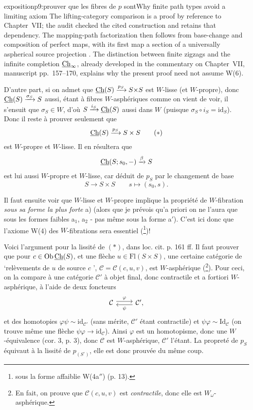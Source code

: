 \begin{dcomment}{exposition}{p9:prouver que les fibres de $p$ sont}{Why finite path types avoid a limiting axiom}
The lifting-category comparison is a proof by reference to Chapter~VII; the audit checked the cited construction and retains that dependency. The mapping-path factorization then follows from base-change and composition of perfect maps, with its first map a section of a universally aspherical source projection \citep[manuscript pp.~170--171]{GrothendieckDerivateursVII}. The distinction between finite zigzags and the infinite completion \(\underline{\mathrm{Ch}}_\infty\), already developed in the commentary on Chapter~VII, manuscript pp.~157--170, explains why the present proof need not assume W(6).
\end{dcomment}


D'autre part, si on admet que $\underline{\mathrm{Ch}}(S) \xrightarrow{p_S} S{\times}S$ est $W$-lisse (et $W$-propre), donc $\underline{\mathrm{Ch}}(S) \xrightarrow{\sigma_S} S$ aussi, étant à fibres $W$-asphériques comme on vient de voir, il s'ensuit que $\sigma_S \in W$, d'où $S \xrightarrow{i_S} \underline{\mathrm{Ch}}(S)$ aussi dans $W$ (puisque $\sigma_S \circ i_S = \mathrm{id}_S$). Donc il reste à prouver seulement que
\[ \underline{\mathrm{Ch}}(S) \xrightarrow{p_S} S \times S \tag*{$(*)$} \]
est $W$-propre et $W$-lisse. Il en résultera que
\[ \underline{\mathrm{Ch}}(S; s_0, -) \xrightarrow{\beta} S \]
est lui aussi $W$-propre et $W$-lisse, car déduit de $p_S$ par le changement de base
\[ S \longrightarrow S \times S \qquad s \longmapsto (s_0, s). \]

Il faut ensuite voir que $W$-lisse et $W$-propre implique la propriété de $W$-fibration \textit{sous sa forme la plus forte} a) (alors que je prévois qu'a priori on ne l'aura que sous les formes faibles a$_1$, a$_2$ - pas même sous la forme a$'$). C'est ici donc que l'axiome W(4) des $W$-fibrations sera essentiel (\footnote[15]{sous la forme affaiblie W(4a$''$) (p. 13).})!

Voici l'argument pour la lissité de $(*)$, dans loc. cit. p. 161 ff. Il faut prouver que pour $c \in \mathrm{Ob}\,\underline{\mathrm{Ch}}(S)$, et une flèche $u \in \mathrm{Fl}(S \times S)$, une certaine catégorie de ‘relèvements de $u$ de source $c$ ’, $\mathcal{C} = \mathcal{C}(c,u,v)$, est $W$-asphérique (\footnote[16]{En fait, on prouve que $\mathcal{C}(c,u,v)$ est \textit{contractile}, donc elle est $W_\omega$-asphérique.}). Pour ceci, on la compare à une catégorie $\mathcal{C}'$ à objet final, donc contractile et a fortiori $W$-asphérique, à l'aide de deux foncteurs
\[ \begin{tikzcd} \mathcal{C} \arrow[r, shift left, "\varphi"] & \mathcal{C}', \arrow[l, shift left, "\psi"] \end{tikzcd} \]
et des homotopies $\varphi\psi \sim \mathrm{id}_{\mathcal{C}'}$ (sans mérite, $\mathcal{C}'$ étant contractile)
et $\psi\varphi \sim \mathrm{Id}_{\mathcal{C}}$ (on trouve même une flèche $\psi\varphi \longrightarrow \mathrm{id}_{\mathcal{C}}$). Ainsi $\varphi$ est un homotopisme, donc une $W$-équivalence (cor. 3, p. 3), donc $\mathcal{C}$ est $W$-asphérique, $\mathcal{C}'$ l'étant. La propreté de $p_S$ équivaut à la lissité de $p_{(S^\circ)}$, elle est donc prouvée du même coup.

